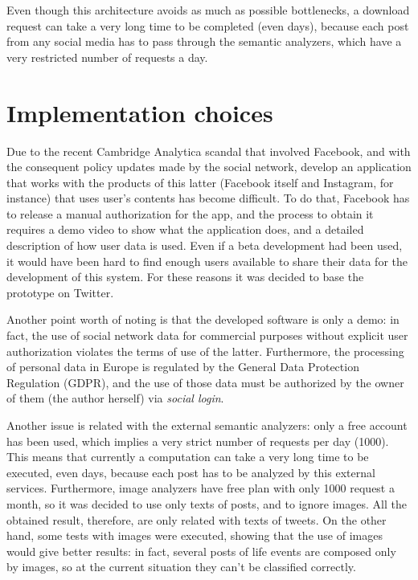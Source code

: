 Even though this architecture avoids as much as possible bottlenecks, a download request can take a very long time to be completed (even days), because each post from any social media has to pass through the semantic analyzers, which have a very restricted number of requests a day.

\section{Implementation choices}
\label{sec:choices}
Due to the recent Cambridge Analytica scandal that involved Facebook, and with the consequent policy updates made by the social network, develop an application that works with the products of this latter (Facebook itself and Instagram, for instance) that uses user's contents has become difficult. To do that, Facebook has to release a manual authorization for the app, and the process to obtain it requires a demo video to show what the application does, and a detailed description of how user data is used. Even if a beta development had been used, it would have been hard to find enough users available to share their data for the development of this system. For these reasons it was decided to base the prototype on Twitter.

Another point worth of noting is that the developed software is only a demo: in fact, the use of social network data for commercial purposes without explicit user authorization violates the terms of use of the latter. Furthermore, the processing of personal data in Europe is regulated by the General Data Protection Regulation (GDPR), and the use of those data must be authorized by the owner of them (the author herself) via \emph{social login}.

Another issue is related with the external semantic analyzers: only a free account has been used, which implies a very strict number of requests per day (1000). This means that currently a computation can take a very long time to be executed, even days, because each post has to be analyzed by this external services. Furthermore, image analyzers have free plan with only 1000 request a month, so it was decided to use only texts of posts, and to ignore images. All the obtained result, therefore, are only related with texts of tweets. On the other hand, some tests with images were executed, showing that the use of images would give better results: in fact, several posts of life events are composed only by images, so at the current situation they can't be classified correctly.

